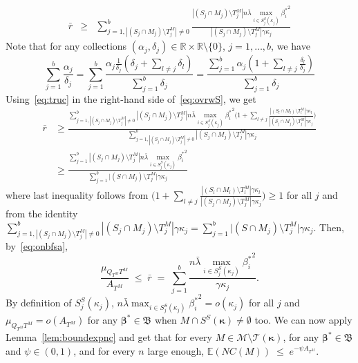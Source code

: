 \documentclass[
  12pt]{article}
\newcommand{\E}{\mathbb{E}}
\newcommand{\R}{\mathbb{R}}
\newcommand{\T}{\mathcal{T}}
\newcommand{\bbeta}{\boldsymbol{\beta}}
\newcommand{\bB}{\mathfrak{B}}
\newcommand{\bkappa}{\boldsymbol{\kappa}}
\begin{document}
\begin{eqnarray}\label{eq:ovrwS}
    \bar{r}
    &\geq &\sum_{j=1,|(S_j\cap M_j )\setminus T^M_j|\neq 0}^b\frac{|(S_j\cap M_j )\setminus T^M_j|n\bar{\lambda}\max_{i\in S_j^{S}(\kappa_j)}{\beta_i^*}^2}{|(S_j\cap M_j )\setminus T^M_j|\gamma\kappa_j}
\end{eqnarray}
Note that for any collections $(\alpha_j,\delta_j)\in  \R\times \R\setminus\{0\}$, $j=1,\ldots,b$, we have
\begin{equation}\label{eq:truc}
    \sum_{j=1}^b\frac{\alpha_j}{\delta_j}=
\sum_{j=1}^b\frac{\alpha_j \frac{1}{\delta_j} (\delta_j + \sum_{l \neq j} \delta_l)}{\sum_{j=1}^b \delta_j}=
    \frac{\sum_{j=1}^b\alpha_j(1+\sum_{l\neq j} \frac{\delta_l}{\delta_j})}{\sum_{j=1}^b\delta_j}
\end{equation}
Using~\eqref{eq:truc} in the right-hand side of~\eqref{eq:ovrwS}, we get
\begin{align*}
     \bar{r}
    &\geq \frac{\sum_{j=1,|(S_j\cap M_j )\setminus T^M_j|\neq 0 }^b|(S_j\cap M_j )\setminus T^M_j|n\bar{\lambda}\max_{i\in S_j^{S}(\kappa_j)}{\beta_i^*}^2\Big(1+\sum_{l\neq j}\frac{|(S_l\cap M_l)\setminus T^M_l|\gamma\kappa_l}{|(S_j\cap M_j )\setminus T^M_j|\gamma\kappa_j}\Big)}{\sum_{j=1,|(S_j\cap M_j )\setminus T^M_j|\neq 0}^b|(S_j\cap M_j )\setminus T^M_j|\gamma\kappa_j} \\
    &\geq \frac{\sum_{j=1}^b|(S_j\cap M_j )\setminus T^M_j|n\bar{\lambda}\max_{i\in S_j^{S}(\kappa_j)}{\beta_i^*}^2}{\sum_{j=1}^b \big|(S\cap M_j)\setminus T^M_j\big|\gamma\kappa_j}
\end{align*}
where last inequality follows from $\Big(1+\sum_{l\neq j}\frac{|(S_l\cap M_l)\setminus T^M_l|\gamma\kappa_l}{|(S_j\cap M_j )\setminus T^M_j|\gamma\kappa_j}\Big)\geq 1$ for all $j$ and from the identity $\sum_{j=1,|(S_j\cap M_j )\setminus T^M_j|\neq 0}^b|(S_j\cap M_j )\setminus T^M_j|\gamma\kappa_j=\sum_{j=1}^b \big|(S\cap M_j)\setminus T^M_j\big|\gamma\kappa_j$. Then,
by~\eqref{eq:onbfsa},
$$\frac{\mu_{Q_{T^M} T^M}}{ A_{T^M}} \;\leq\; \bar{r} \;= \;\sum_{j=1}^b\frac{n\bar{\lambda}\max_{i\in S_j^{S}(\kappa_j)}{\beta_i^*}^2}{\gamma\kappa_j}.$$
By definition of $S_j^{S}(\kappa_j)$, $n\bar{\lambda}\max_{i\in S_j^{S}(\kappa_j)}{\beta_i^*}^2=o(\kappa_j)$ for all $j$ and $\mu_{Q_{T^M} T^M}=o(A_{T^M})$ for any $\bbeta^*\in \bB$ when $M\cap S^{S}(\bkappa)\neq\emptyset$ too.
We can now apply Lemma~\ref{lem:boundexpnc} and get that for every $M\in \mathcal M\setminus \T(\bkappa)$, for any $\bbeta^*\in \bB$  and $\psi\in(0,1)$, and for every $n$ large enough, $\E(NC(M))\;\leq\;e^{-\psi A_{T^M}}$.
\end{document}
